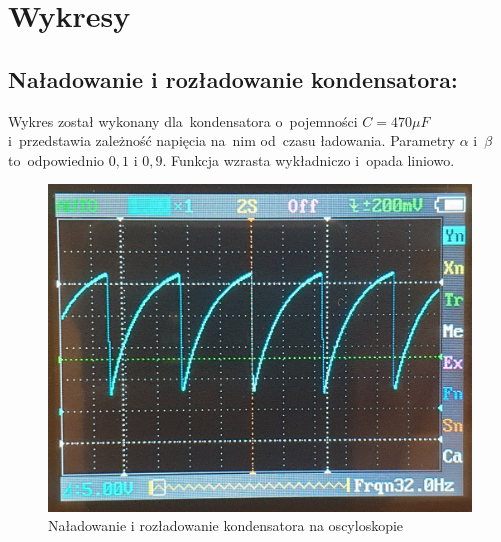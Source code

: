 \documentclass[12pt]{mwart}
\begin{document}
	\section{Wykresy}\label{wykresy}
	\subsection{Naładowanie i rozładowanie kondensatora:}
	\noindent Wykres został wykonany dla~kondensatora o~pojemności $C=470\mu F$ i~przedstawia zależność napięcia na~nim od~czasu ładowania. Parametry $\alpha$ i~$\beta$ to~odpowiednio $0,1$ i $0,9$. Funkcja wzrasta wykładniczo i~opada liniowo.
	\begin{figure}[H]
		\centering
		\includegraphics[scale=0.2]{oscyloskop.jpg}
		\caption{Naładowanie i rozładowanie kondensatora na oscyloskopie}
	\end{figure}
\end{document}
